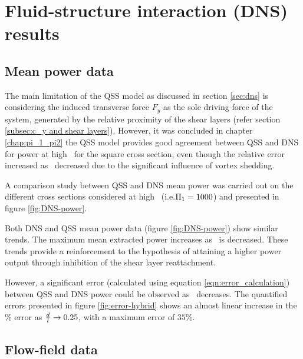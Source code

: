 \section{Fluid-structure interaction (DNS) results}
\label{sec:cross-sec-FSI-results}

\subsection{Mean power data}
\label{subsec:cross-sec-dns-mean-power}

 The main limitation of the QSS model as discussed in section \ref{sec:dns} is considering the induced transverse force $F_{y}$ as the sole driving force of the system, generated by the relative proximity of the shear layers (refer section \ref{subsec:c_y and shear layers}). However, it was concluded in chapter \ref{chap:pi_1_pi2} the QSS model provides good agreement between QSS and DNS for power at high \massstiff\ for the square cross section, even though the relative error increased as \massstiff\ decreased due to the significant influence of vortex shedding.


  A comparison study between QSS and DNS mean power was carried out on the different cross sections considered at high \massstiff\ (i.e.$\Pi_1=1000$) and presented in figure \ref{fig:DNS-power}.


Both  DNS and QSS mean power data (figure \ref{fig:DNS-power}) show similar trends. The maximum mean extracted power increases as \ratio\ is decreased. These trends provide a reinforcement to the hypothesis of attaining a higher power output through inhibition of the shear layer reattachment.   

However, a significant error (calculated using equation \ref{eqn:error_calculation}) between QSS and DNS power could be observed as \ratio\ decreases. The quantified errors presented in figure \ref{fig:error-hybrid} shows an almost linear increase in the $\%$ error as $\frac{d}{l} \rightarrow 0.25$, with a maximum error of $35\%$.



\subsection{Flow-field data}

